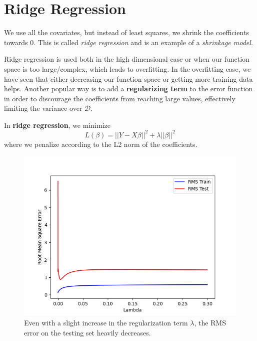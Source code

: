 \section{Ridge Regression} 

  We use all the covariates, but instead of least squares, we shrink the coefficients towards $0$. This is called \textit{ridge regression} and is an example of a \textit{shrinkage model}. 

  Ridge regression is used both in the high dimensional case or when our function space is too large/complex, which leads to overfitting. In the overfitting case, we have seen that either decreasing our function space or getting more training data helps. Another popular way is to add a \textbf{regularizing term} to the error function in order to discourage the coefficients from reaching large values, effectively limiting the variance over $\mathcal{D}$. 

  \begin{definition}
    In \textbf{ridge regression}, we minimize 
    \begin{equation}
      L(\beta) = ||Y - X \beta||^2 + \lambda ||\beta||^2 
    \end{equation}
    where we penalize according to the L2 norm of the coefficients. 
  \end{definition}

  \begin{figure}[H]
    \centering
    \includegraphics[scale=0.5]{img/Lambda_vs_RMS.png}
    \caption{Even with a slight increase in the regularization term $\lambda$, the RMS error on the testing set heavily decreases. }
    \label{fig:enter-label}
  \end{figure}

